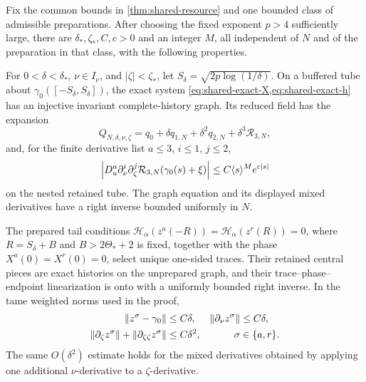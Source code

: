\begin{lemma}
\label{lem:shared-graph-trace}
Fix the common bounds in \cref{thm:shared-resource} and one bounded class of
admissible preparations.  After choosing the fixed exponent \(p>4\)
sufficiently large, there are \(\delta_*,\zeta_*,C,c>0\) and an integer
\(M\), all independent of \(N\) and of the preparation in that class, with
the following properties.

For \(0<\delta<\delta_*\), \(\nu\in I_\nu\), and
\(|\zeta|<\zeta_*\), let
\(S_\delta=\sqrt{2p\log(1/\delta)}\).  On a buffered tube about
\(\gamma_0([-S_\delta,S_\delta])\), the exact system
\cref{eq:shared-exact-X,eq:shared-exact-h} has an injective invariant
complete-history graph.  Its reduced field has the expansion
\begin{equation}
 Q_{N,\delta,\nu,\zeta}
 =q_0+\delta q_{1,N}+\delta^2q_{2,N}
       +\delta^3\mathcal R_{3,N},                     \label{eq:shared-graph-expansion}
\end{equation}
and, for the finite derivative list \(a\le3\), \(i\le1\), \(j\le2\),
\begin{equation}
 \left\lvert D_u^a\partial_\nu^i\partial_\zeta^j
       \mathcal R_{3,N}(\gamma_0(s)+\xi)\right\rvert
 \le C\langle s\rangle^M e^{c|s|}                   \label{eq:shared-graph-remainder}
\end{equation}
on the nested retained tube.  The graph equation and its displayed mixed
derivatives have a right inverse bounded uniformly in \(N\).

The prepared tail conditions
\(\mathscr H_\alpha(z^a(-R))=\mathscr H_\alpha(z^r(R))=0\), where
\(R=S_\delta+B\) and \(B>2\Theta_*+2\) is fixed, together with the phase
\(X^a(0)=X^r(0)=0\), select unique one-sided traces.  Their retained central
pieces are exact histories on the unprepared graph, and their trace--phase--
endpoint linearization is onto with a uniformly bounded right inverse.
In the tame weighted norms used in the proof,
\begin{align}
 \left\lVert z^\sigma-\gamma_0\right\rVert&\le C\delta,&
 \left\lVert\partial_\nu z^\sigma\right\rVert&\le C\delta,\notag\\
 \left\lVert\partial_\zeta z^\sigma\right\rVert
  +\left\lVert\partial_{\zeta\zeta}z^\sigma\right\rVert&\le C\delta^2,
 &\sigma&\in\{a,r\}.                                  \label{eq:shared-trace-jets}
\end{align}
The same \(O(\delta^2)\) estimate holds for the mixed derivatives obtained
by applying one additional \(\nu\)-derivative to a \(\zeta\)-derivative.
\end{lemma}

